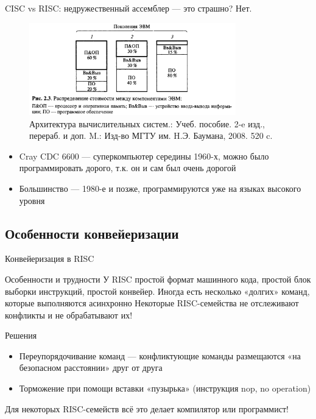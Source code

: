 \documentclass[xetex,aspectratio=43]{beamer}
\begin{document}
\begin{frame}{CISC vs RISC: недружественный ассемблер --- это страшно?}
        \alert{Нет.}
        \begin{figure}
            \includegraphics[width=0.8\textwidth]{img/11.generation_prices.png}
            \caption{Архитектура вычислительных систем.: Учеб. пособие. 2-e изд., перераб. и доп. M.: Изд-во МГТУ им. H.Э. Баумана, 2008. 520 c.}
        \end{figure}

        \begin{itemize}
            \item Cray CDC 6600 --- суперкомпьютер середины 1960-х, можно было программировать дорого, т.к. он и сам был очень дорогой
            \item Большинство --- 1980-е и позже, программируются уже на языках высокого уровня
        \end{itemize}
\end{frame}

\subsection{Особенности конвейеризации}

\begin{frame}{Конвейеризация в RISC}
    \begin{block}{Особенности и трудности}
        У RISC простой формат машинного кода, простой блок выборки инструкций, простой конвейер.
        Иногда есть несколько «долгих» команд, которые выполняются асинхронно
                \alert{Некоторые RISC-семейства не отслеживают конфликты и не обрабатывают их!}
    \end{block}

    \pause

    \begin{block}{Решения}
        \begin{itemize}
            \item Переупорядочивание команд — конфликтующие команды размещаются «на безопасном расстоянии» друг от друга
            \item Торможение при помощи вставки «пузырька» (инструкция nop, no operation)
        \end{itemize}
        \alert{Для некоторых RISC-семейств всё это делает компилятор или программист!}
    \end{block}
\end{frame}
\end{document}
